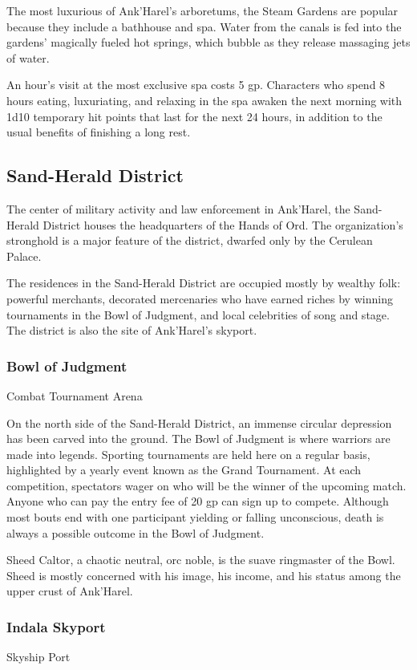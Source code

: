 \documentclass[10pt,a4paper,twoside,twocolumn,openany,nodeprecatedcode]{dndbook}
\begin{document}
The most luxurious of Ank'Harel's arboretums, the Steam Gardens are popular because they include a bathhouse and spa. Water from the canals is fed into the gardens' magically fueled hot springs, which bubble as they release massaging jets of water.

An hour's visit at the most exclusive spa costs 5 gp. Characters who spend 8 hours eating, luxuriating, and relaxing in the spa awaken the next morning with 1d10 temporary hit points that last for the next 24 hours, in addition to the usual benefits of finishing a long rest.

\subsection{Sand-Herald District}
The center of military activity and law enforcement in Ank'Harel, the Sand-Herald District houses the headquarters of the Hands of Ord. The organization's stronghold is a major feature of the district, dwarfed only by the Cerulean Palace.

The residences in the Sand-Herald District are occupied mostly by wealthy folk: powerful merchants, decorated mercenaries who have earned riches by winning tournaments in the Bowl of Judgment, and local celebrities of song and stage. The district is also the site of Ank'Harel's skyport.

\subsubsection{Bowl of Judgment}
Combat Tournament Arena

On the north side of the Sand-Herald District, an immense circular depression has been carved into the ground. The Bowl of Judgment is where warriors are made into legends. Sporting tournaments are held here on a regular basis, highlighted by a yearly event known as the Grand Tournament. At each competition, spectators wager on who will be the winner of the upcoming match. Anyone who can pay the entry fee of 20 gp can sign up to compete. Although most bouts end with one participant yielding or falling unconscious, death is always a possible outcome in the Bowl of Judgment.

Sheed Caltor, a chaotic neutral, orc noble, is the suave ringmaster of the Bowl. Sheed is mostly concerned with his image, his income, and his status among the upper crust of Ank'Harel.

\subsubsection{Indala Skyport}
Skyship Port
\end{document}
